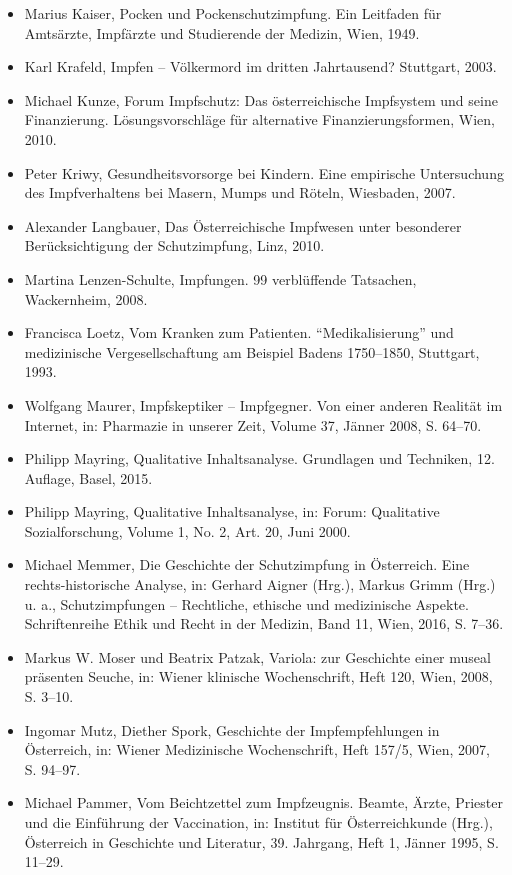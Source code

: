 \documentclass[
    a4paper,
    12pt,
    hyphens,
    chapterprefix=true,
    headheight=33pt,
    footheight=29pt,
    headings=optiontohead, %
]{scrartcl}
\begin{document}
{\begin{itemize}
\item{Marius Kaiser, Pocken und Pockenschutzimpfung. Ein Leitfaden für Amtsärzte, Impfärzte und Studierende der Medizin, Wien, 1949.}
\item{Karl Krafeld, Impfen -- Völkermord im dritten Jahrtausend? Stuttgart, 2003.}
\item{Michael Kunze, Forum Impfschutz: Das österreichische Impfsystem und seine Finanzierung. Lösungsvorschläge für alternative Finanzierungsformen, Wien, 2010.}
\item{Peter Kriwy, Gesundheitsvorsorge bei Kindern. Eine empirische Untersuchung des Impfverhaltens bei Masern, Mumps und Röteln, Wiesbaden, 2007.}
\item{Alexander Langbauer, Das Österreichische Impfwesen unter besonderer Berücksichtigung der Schutzimpfung, Linz, 2010.}
\item{Martina Lenzen-Schulte, Impfungen. 99 verblüffende Tatsachen, Wackernheim, 2008.}
\item{Francisca Loetz, Vom Kranken zum Patienten. "`Medikalisierung"' und medizinische Vergesellschaftung am Beispiel Badens 1750--1850, Stuttgart, 1993.}
\item{Wolfgang Maurer, Impfskeptiker -- Impfgegner. Von einer anderen Realität im Internet, in: Pharmazie in unserer Zeit, Volume 37, Jänner 2008, S. 64--70.}
\item{Philipp Mayring, Qualitative Inhaltsanalyse. Grundlagen und Techniken, 12. Auflage, Basel, 2015.}
\item{Philipp Mayring, Qualitative Inhaltsanalyse, in: Forum: Qualitative Sozialforschung, Volume 1, No. 2, Art. 20, Juni 2000.}
\item{Michael Memmer, Die Geschichte der Schutzimpfung in Österreich. Eine rechts-historische Analyse, in: Gerhard Aigner (Hrg.), Markus Grimm (Hrg.) u. a., Schutzimpfungen -- Rechtliche, ethische und medizinische Aspekte. Schriftenreihe Ethik und Recht in der Medizin, Band 11, Wien, 2016, S. 7--36.}
\item{Markus W. Moser und Beatrix Patzak, Variola: zur Geschichte einer museal präsenten Seuche, in: Wiener klinische Wochenschrift, Heft 120, Wien, 2008, S. 3--10.}
\item{Ingomar Mutz, Diether Spork, Geschichte der Impfempfehlungen in Österreich, in: Wiener Medizinische Wochenschrift, Heft 157/5, Wien, 2007, S. 94--97.}
\item{Michael Pammer, Vom Beichtzettel zum Impfzeugnis. Beamte, Ärzte, Priester und die Einführung der Vaccination, in: Institut für Österreichkunde (Hrg.), Österreich in Geschichte und Literatur, 39. Jahrgang, Heft 1, Jänner 1995, S. 11--29.}

\end{itemize}}
\end{document}
